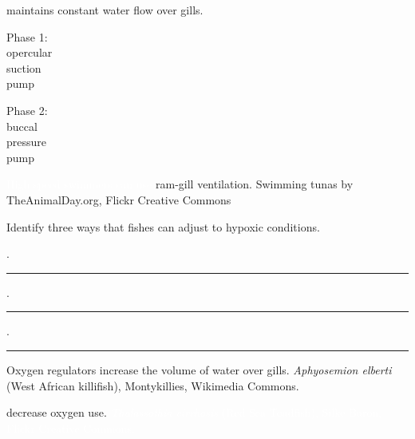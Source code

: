 \documentclass[t]{beamer}
\begin{document}
{
\begin{frame}[t,plain]{ maintains constant water flow over gills.}

\hangpara\hspace{1.5em}\parbox{2cm}{Phase 1:\\opercular\\ suction\\ pump}
\pause\hspace{8.2em}\parbox{2cm}{Phase 2:\\buccal\\ pressure\\ pump}

\end{frame}
}

{
\begin{frame}[b,plain]{\textcolor{white}{High speed swimmers can use} \textcolor{orange7}{ram-gill ventilation.}}
\tiny\textcolor{white!20!black}{Swimming tunas by TheAnimalDay.org, Flickr Creative Commons}
\end{frame}
}

\begin{frame}[c,plain]{Identify three ways that fishes can adjust to hypoxic conditions.}

	. \rule{6cm}{0.4pt}

	\vspace{2\baselineskip}

	. \rule{6cm}{0.4pt}

	\vspace{2\baselineskip}

	. \rule{6cm}{0.4pt}

	\vspace{2\baselineskip}

\end{frame}

{
\begin{frame}[b,plain]{\textcolor{orange7}{Oxygen regulators} increase the volume of water over gills.}
\hfill\tiny\textcolor{white!70!black}{\textit{Aphyosemion elberti} (West African killifish), Montykillies, Wikimedia Commons.}
\end{frame}
}

{
\begin{frame}[b,plain]{ decrease oxygen use.}
\hfill\tiny\textcolor{white}{\textit{Thalassothia cirrhosis} (Red Sea Toadfish), Silke Baron, Flickr Creative Commons.}
\end{frame}
}
\end{document}
